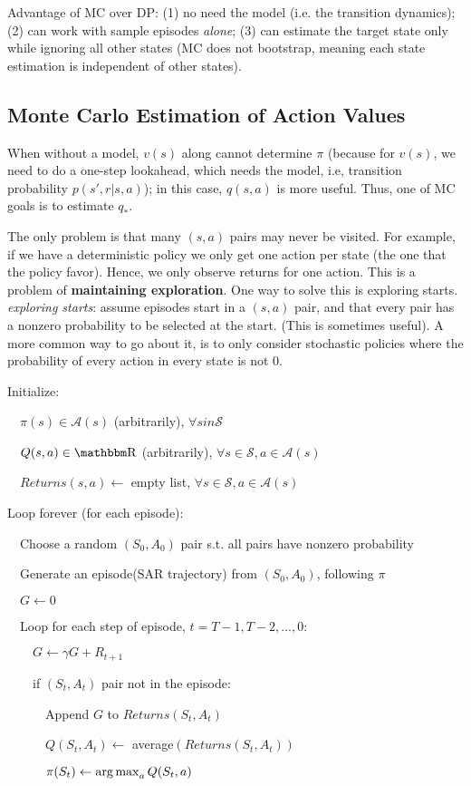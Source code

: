 \documentclass[sutton_barto_notes.tex]{subfiles}
\begin{document}
Advantage of MC over DP: (1) no need the model (i.e. the transition dynamics); (2) can work with sample episodes \textit{alone}; (3) can estimate the target state only while ignoring all other states (MC does not bootstrap, meaning each state estimation is independent of other states).

\subsection{Monte Carlo Estimation of Action Values}

When without a model, $v(s)$ along cannot determine $\pi$ (because for $v(s)$, we need to do a one-step lookahead, which needs the model, i.e, transition probability $p(s',r|s,a)$); in this case, $q(s,a)$ is more useful. Thus, one of MC goals is to estimate $q_*$.

The only problem is that many $(s,a)$ pairs may never be visited. For example, if we have a deterministic policy we only get one action per state (the one that the policy favor). Hence, we only observe returns for one action. This is a problem of \textbf{maintaining exploration}.
One way to solve this is exploring starts.
\textit{exploring starts}: assume episodes start in a $(s,a)$ pair, and that every pair has a nonzero probability to be selected at the start. (This is sometimes useful). A more common way to go about it, is to only consider stochastic policies where the probability of every action in every state is not 0.

\begin{tcolorbox}[width=1.1\textwidth,title={MC Exploring Starts, for estimating $V \approx v_\pi$}]
Initialize:

$\quad \pi(s) \in \mathcal{A}(s)$ (arbitrarily), $\forall s in \mathcal{S}$

$\quad Q(s,a) \in \R$ (arbitrarily), $\forall s \in \mathcal{S}, a \in \mathcal{A}(s)$

$\quad Returns(s,a) \leftarrow$ empty list, $\forall s \in \mathcal{S}, a \in \mathcal{A}(s)$

Loop forever (for each episode):

$\quad$Choose a random $(S_0, A_0)$ pair s.t. all pairs have nonzero probability

$\quad$Generate an episode(SAR trajectory) from $(S_0, A_0)$, following $\pi$

$\quad G \leftarrow 0$

$\quad$Loop for each step of episode, $t = T-1, T-2, ..., 0$:

$\quad\quad G\leftarrow \gamma G + R_{t+1}$

$\quad\quad$if $(S_t, A_t)$ pair not in the episode:

$\quad\quad\quad$Append $G$ to $Returns(S_t, A_t)$

$\quad\quad\quad Q(S_t, A_t) \leftarrow$ average$(Returns(S_t, A_t))$

$\quad\quad\quad \pi(S_t) \leftarrow \operatorname*{arg\,max}_a Q(S_t, a)$

\end{tcolorbox}
\end{document}
